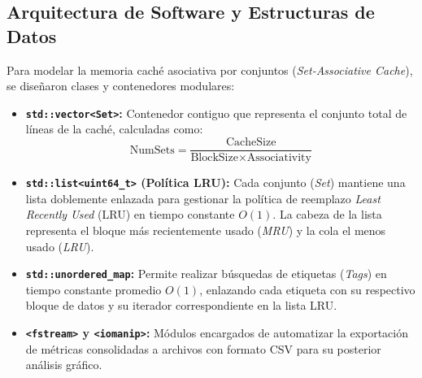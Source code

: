 \documentclass[12pt,letterpaper]{article}
\begin{document}
\subsection{\color{UCSky}Arquitectura de Software y Estructuras de Datos}
Para modelar la memoria caché asociativa por conjuntos (\textit{Set-Associative Cache}), se diseñaron clases y contenedores modulares:
\begin{itemize}
    \item \textbf{\texttt{std::vector<Set>}:} Contenedor contiguo que representa el conjunto total de líneas de la caché, calculadas como:\\
    $$\text{NumSets} = \frac{\text{CacheSize}}{\text{BlockSize} \times \text{Associativity}}$$
    \item \textbf{\texttt{std::list<uint64_t>} (Política LRU):} Cada conjunto (\textit{Set}) mantiene una lista doblemente enlazada para gestionar la política de reemplazo \textit{Least Recently Used} (LRU) en tiempo constante $O(1)$. La cabeza de la lista representa el bloque más recientemente usado (\textit{MRU}) y la cola el menos usado (\textit{LRU}).
    \item \textbf{\texttt{std::unordered_map}:} Permite realizar búsquedas de etiquetas (\textit{Tags}) en tiempo constante promedio $O(1)$, enlazando cada etiqueta con su respectivo bloque de datos y su iterador correspondiente en la lista LRU.
    \item \textbf{\texttt{<fstream>} y \texttt{<iomanip>}:} Módulos encargados de automatizar la exportación de métricas consolidadas a archivos con formato CSV para su posterior análisis gráfico.
\end{itemize}
\end{document}
